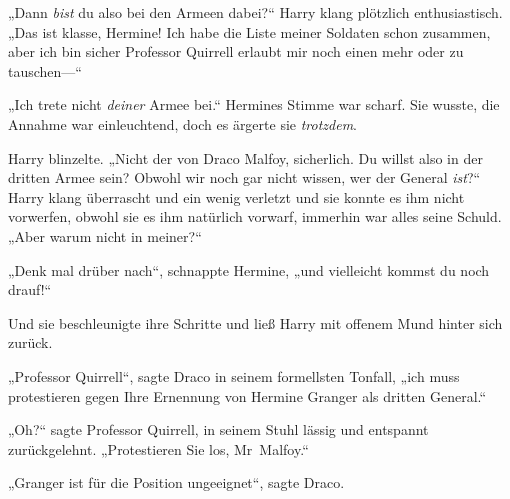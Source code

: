 „Dann \emph{bist} du also bei den Armeen dabei?“ Harry klang plötzlich enthusiastisch. „Das ist klasse, Hermine! Ich habe die Liste meiner Soldaten schon zusammen, aber ich bin sicher Professor Quirrell erlaubt mir noch einen mehr oder zu tauschen—“

„Ich trete nicht \emph{deiner} Armee bei.“ Hermines Stimme war scharf. Sie wusste, die Annahme war einleuchtend, doch es ärgerte sie \emph{trotzdem}.

Harry blinzelte. „Nicht der von Draco Malfoy, sicherlich. Du willst also in der dritten Armee sein? Obwohl wir noch gar nicht wissen, wer der General \emph{ist}?“ Harry klang überrascht und ein wenig verletzt und sie konnte es ihm nicht vorwerfen, obwohl sie es ihm natürlich vorwarf, immerhin war alles seine Schuld. „Aber warum nicht in meiner?“

„Denk mal drüber nach“, schnappte Hermine, „und vielleicht kommst du noch drauf!“

Und sie beschleunigte ihre Schritte und ließ Harry mit offenem Mund hinter sich zurück.

\later

„Professor Quirrell“, sagte Draco in seinem formellsten Tonfall, „ich muss protestieren gegen Ihre Ernennung von Hermine Granger als dritten General.“

„Oh?“ sagte Professor Quirrell, in seinem Stuhl lässig und entspannt zurückgelehnt. „Protestieren Sie los, Mr~Malfoy.“

„Granger ist für die Position ungeeignet“, sagte Draco.

